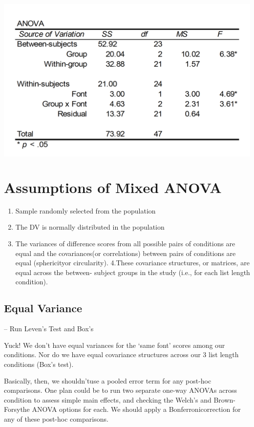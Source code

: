 \documentclass[]{book}
\providecommand{\tightlist}{%
  \setlength{\itemsep}{0pt}\setlength{\parskip}{0pt}}
\theoremstyle{definition}
\theoremstyle{definition}
\theoremstyle{definition}
\theoremstyle{remark}
\begin{document}
\includegraphics{img/hicksfdrm12.png}

\section{Assumptions of Mixed ANOVA}\label{assumptions-of-mixed-anova}

\begin{enumerate}
\def\labelenumi{\arabic{enumi}.}
\tightlist
\item
  Sample randomly selected from the population
\item
  The DV is normally distributed in the population
\item
  The variances of difference scores from all possible pairs of
  conditions are equal and the covariances(or correlations) between
  pairs of conditions are equal (sphericityor circularity). 4.These
  covariance structures, or matrices, are equal across the between-
  subject groups in the study (i.e., for each list length condition).
\end{enumerate}

\subsection{Equal Variance}\label{equal-variance}

-- Run Leven's Test and Box's

Yuck! We don't have equal variances for the `same font' scores among our
conditions. Nor do we have equal covariance structures across our 3 list
length conditions (Box's test).

Basically, then, we shouldn'tuse a pooled error term for any post-hoc
comparisons. One plan could be to run two separate one-way ANOVAs across
condition to assess simple main effects, and checking the Welch's and
Brown-Forsythe ANOVA options for each. We should apply a
Bonferronicorrection for any of these post-hoc comparisons.
\end{document}
